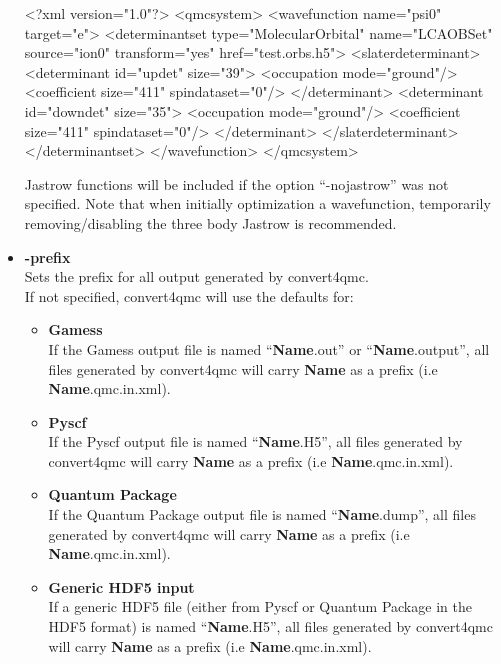 \begin{itemize}
\begin{shade}
 <?xml version="1.0"?>
<qmcsystem>
  <wavefunction name="psi0" target="e">
    <determinantset type="MolecularOrbital" name="LCAOBSet" source="ion0"
       transform="yes" href="test.orbs.h5">
      <slaterdeterminant>
        <determinant id="updet" size="39">
          <occupation mode="ground"/>
          <coefficient size="411" spindataset="0"/>
        </determinant>
        <determinant id="downdet" size="35">
          <occupation mode="ground"/>
          <coefficient size="411" spindataset="0"/>
        </determinant>
      </slaterdeterminant>
    </determinantset>
  </wavefunction>
</qmcsystem>

\end{shade}

Jastrow functions will be included if the option ``-nojastrow'' was
not specified. Note that when initially optimization a wavefunction,
temporarily removing/disabling the three body Jastrow is recommended.

\item \textbf{-prefix}\\
Sets the prefix for all output generated by convert4qmc. \\
If not specified, convert4qmc will use the defaults for:\\
\begin{itemize}
 \item \textbf{Gamess}\\
If the Gamess output file  is named ``\textbf{Name}.out'' or ``\textbf{Name}.output'', all files generated by convert4qmc will carry \textbf{Name} as a prefix (i.e \textbf{Name}.qmc.in.xml).\\ 
\item \textbf{Pyscf}\\
If the Pyscf output file  is named ``\textbf{Name}.H5'', all files generated by convert4qmc will carry \textbf{Name} as a prefix (i.e \textbf{Name}.qmc.in.xml).\\ 
\item \textbf{Quantum Package}\\
If the Quantum Package output file  is named ``\textbf{Name}.dump'', all files generated by convert4qmc will carry \textbf{Name} as a prefix (i.e \textbf{Name}.qmc.in.xml).\\ 
\item \textbf{Generic HDF5 input}\\
If a generic HDF5 file (either from Pyscf or Quantum Package in the HDF5 format) is named ``\textbf{Name}.H5'', all files generated by convert4qmc will carry \textbf{Name} as a prefix (i.e \textbf{Name}.qmc.in.xml).\\ 


\end{itemize}
\end{itemize}
